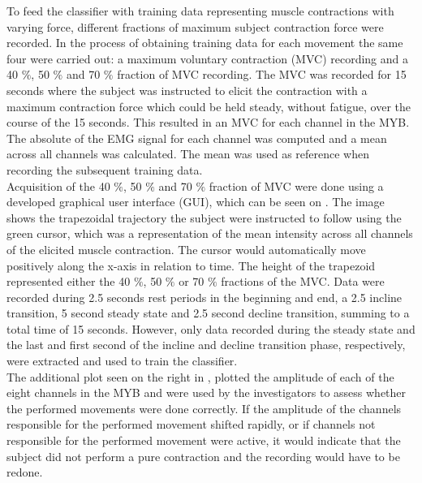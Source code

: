 To feed the classifier with training data representing muscle contractions with varying force, different fractions of maximum subject contraction force were recorded. In the process of obtaining training data for each movement the same four were carried out: a maximum voluntary contraction (MVC) recording and a 40 $\percent$, 50 $\percent$ and 70 $\percent$ fraction of MVC recording.
The MVC was recorded for 15 seconds where the subject was instructed to elicit the contraction with a maximum contraction force which could be held steady, without fatigue, over the course of the 15 seconds. This resulted in an MVC for each channel in the MYB. The absolute of the EMG signal for each channel was computed and a mean across all channels was calculated. The mean was used as reference when recording the subsequent training data. \\
Acquisition of the 40 $\percent$, 50 $\percent$ and 70 $\percent$ fraction of MVC were done using a developed graphical user interface (GUI), which can be seen on . The image shows the trapezoidal trajectory the subject were instructed to follow using the green cursor, which was a representation of the mean intensity across all channels of the elicited muscle contraction. The cursor would automatically move positively along the x-axis in relation to time. The height of the trapezoid represented either the 40 $\percent$, 50 $\percent$ or 70 $\percent$ fractions of the MVC. Data were recorded during 2.5 seconds rest periods in the beginning and end, a 2.5 incline transition, 5 second steady state and 2.5 second decline transition, summing to a total time of 15 seconds. However, only data recorded during the steady state and the last and first second of the incline and decline transition phase, respectively, were extracted and used to train the classifier. \\
The additional plot seen on the right in , plotted the amplitude of each of the eight channels in the MYB and were used by the investigators to assess whether the performed movements were done correctly. If the amplitude of the channels responsible for the performed movement shifted rapidly, or if channels not responsible for the performed movement were active, it would indicate that the subject did not perform a pure contraction and the recording would have to be redone.   
   
   
